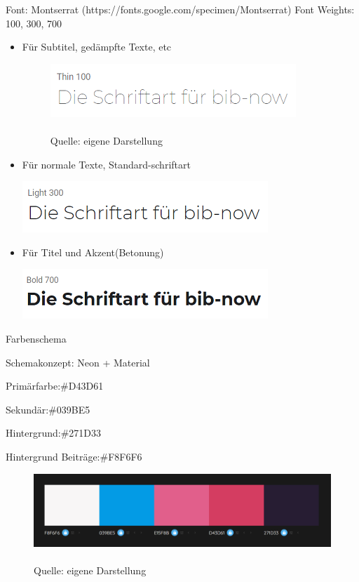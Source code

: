 \documentclass[12pt,titlepage]{article}
\begin{document}
Font: Montserrat (https://fonts.google.com/specimen/Montserrat)
Font Weights: 100, 300, 700
\vspace{2cm}
\begin{itemize}
\item
	Für Subtitel, gedämpfte Texte, etc

\begin{figure}[hbt!]
\centering
\includegraphics{images/Schriftart_100.png}
\caption[Schriftart 100]{\\Quelle: eigene Darstellung}
\end{figure}
\item
	Für normale Texte, Standard-schriftart

\includegraphics{images/Schriftart_300.png}
\item
	Für Titel und Akzent(Betonung)

\includegraphics{images/Schriftart_700.png}
\end{itemize}


Farbenschema

Schemakonzept: Neon + Material

Primärfarbe:\#D43D61

Sekundär:\#039BE5

Hintergrund:\#271D33

Hintergrund Beiträge:\#F8F6F6

\begin{figure}[hbt!]
\centering
\includegraphics[width=400pt]{images/Schema_1.png}
\caption[Farbenschema]{\\Quelle: eigene Darstellung}
\end{figure}
\end{document}
